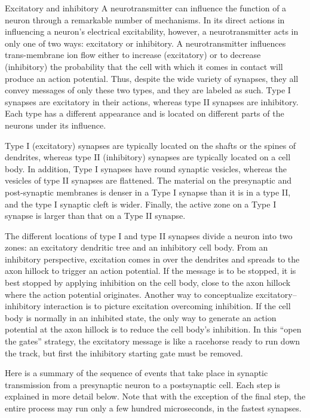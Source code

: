 \documentclass[]{book}
\begin{document}
Excitatory and inhibitory
A neurotransmitter can influence the function of a neuron through a remarkable number of mechanisms. In its direct actions in influencing a neuron's electrical excitability, however, a neurotransmitter acts in only one of two ways: excitatory or inhibitory. A neurotransmitter influences trans-membrane ion flow either to increase (excitatory) or to decrease (inhibitory) the probability that the cell with which it comes in contact will produce an action potential. Thus, despite the wide variety of synapses, they all convey messages of only these two types, and they are labeled as such. Type I synapses are excitatory in their actions, whereas type II synapses are inhibitory. Each type has a different appearance and is located on different parts of the neurons under its influence.

Type I (excitatory) synapses are typically located on the shafts or the spines of dendrites, whereas type II (inhibitory) synapses are typically located on a cell body. In addition, Type I synapses have round synaptic vesicles, whereas the vesicles of type II synapses are flattened. The material on the presynaptic and post-synaptic membranes is denser in a Type I synapse than it is in a type II, and the type I synaptic cleft is wider. Finally, the active zone on a Type I synapse is larger than that on a Type II synapse.

The different locations of type I and type II synapses divide a neuron into two zones: an excitatory dendritic tree and an inhibitory cell body. From an inhibitory perspective, excitation comes in over the dendrites and spreads to the axon hillock to trigger an action potential. If the message is to be stopped, it is best stopped by applying inhibition on the cell body, close to the axon hillock where the action potential originates. Another way to conceptualize excitatory--inhibitory interaction is to picture excitation overcoming inhibition. If the cell body is normally in an inhibited state, the only way to generate an action potential at the axon hillock is to reduce the cell body's inhibition. In this ``open the gates'' strategy, the excitatory message is like a racehorse ready to run down the track, but first the inhibitory starting gate must be removed.

Here is a summary of the sequence of events that take place in synaptic transmission from a presynaptic neuron to a postsynaptic cell. Each step is explained in more detail below. Note that with the exception of the final step, the entire process may run only a few hundred microseconds, in the fastest synapses.
\end{document}
